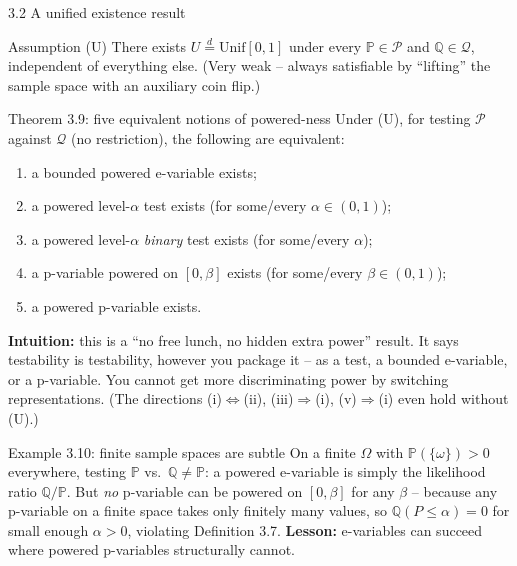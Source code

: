 \documentclass[aspectratio=169,10pt]{beamer}
\newcommand{\PP}{\mathbb{P}}
\newcommand{\QQ}{\mathbb{Q}}
\newcommand{\calP}{\mathcal{P}}
\newcommand{\calQ}{\mathcal{Q}}
\begin{document}
\begin{frame}[allowframebreaks]{3.2 A unified existence result}
  \begin{block}{Assumption (U)}
    There exists $U\stackrel{d}{=}\mathrm{Unif}[0,1]$ under every $\PP\in\calP$ and $\QQ\in\calQ$, independent of everything else. (Very weak -- always satisfiable by ``lifting'' the sample space with an auxiliary coin flip.)
  \end{block}

  \begin{block}{Theorem 3.9: five equivalent notions of powered-ness}
    Under (U), for testing $\calP$ against $\calQ$ (no restriction), the following are equivalent:
    \begin{enumerate}
      \item[(i)] a bounded powered e-variable exists;
      \item[(ii)] a powered level-$\alpha$ test exists (for some/every $\alpha\in(0,1)$);
      \item[(iii)] a powered level-$\alpha$ \emph{binary} test exists (for some/every $\alpha$);
      \item[(iv)] a p-variable powered on $[0,\beta]$ exists (for some/every $\beta\in(0,1)$);
      \item[(v)] a powered p-variable exists.
    \end{enumerate}
  \end{block}

  \textbf{Intuition:} this is a ``no free lunch, no hidden extra power'' result. It says testability is testability, however you package it -- as a test, a bounded e-variable, or a p-variable. You cannot get more discriminating power by switching representations. (The directions (i)$\Leftrightarrow$(ii), (iii)$\Rightarrow$(i), (v)$\Rightarrow$(i) even hold without (U).)

  \begin{exampleblock}{Example 3.10: finite sample spaces are subtle}
    On a finite $\Omega$ with $\PP(\{\omega\})>0$ everywhere, testing $\PP$ vs.\ $\QQ\ne\PP$: a powered e-variable is simply the likelihood ratio $\QQ/\PP$. But \emph{no} p-variable can be powered on $[0,\beta]$ for any $\beta$ -- because any p-variable on a finite space takes only finitely many values, so $\QQ(P\le\alpha)=0$ for small enough $\alpha>0$, violating Definition 3.7. \textbf{Lesson:} e-variables can succeed where powered p-variables structurally cannot.
  \end{exampleblock}
\end{frame}
\end{document}
